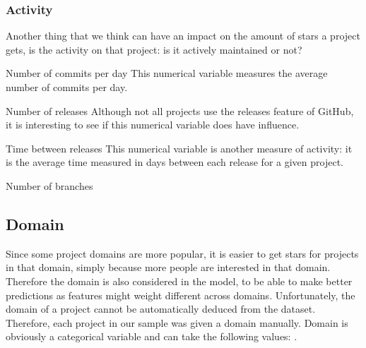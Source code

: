 

    \subsubsection{Activity}
        Another thing that we think can have an impact on the amount of stars a project gets, is the activity on that project: is it actively maintained or not?
    \begin{LaTeXdescription}
        \item[Number of commits per day]
            This numerical variable measures the average number of commits per day.
        \item[Number of releases]
            Although not all projects use the releases feature of GitHub, it is interesting to see if this numerical variable does have influence.
        \item[Time between releases]
            This numerical variable is another measure of activity: it is the average time measured in days between each release for a given project.
        \item[Number of branches]         
    \end{LaTeXdescription}


 
    \subsection{Domain}
        Since some project domains are more popular, it is easier to get stars for projects in that domain, simply because more people are interested in that domain.
        Therefore the domain is also considered in the model, to be able to make better predictions as features might weight different across domains.
        Unfortunately, the domain of a project cannot be automatically deduced from the dataset. 
        Therefore, each project in our sample was given a domain manually. Domain is obviously a categorical variable and can take the following values: .

